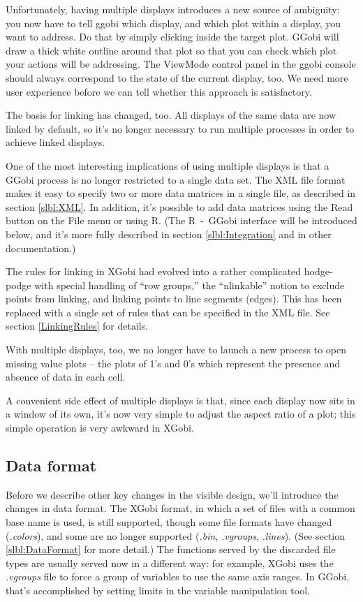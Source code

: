 \documentclass[11pt]{article}
\begin{document}
Unfortunately, having multiple displays introduces a new source of
ambiguity: you now have to tell ggobi which display, and which plot
within a display, you want to address.  Do that by simply clicking
inside the target plot.  GGobi will draw a thick white outline around
that plot so that you can check which plot your actions will be
addressing.  The ViewMode control panel in the ggobi console should
always correspond to the state of the current display, too.  We need
more user experience before we can tell whether this approach is
satisfactory.

The basis for linking has changed, too.  All displays of the same data
are now linked by default, so it's no longer necessary to run
multiple processes in order to achieve linked displays.

One of the most interesting implications of using multiple displays
is that a GGobi process is no longer restricted to a single data
set.  The XML file format makes it easy to specify two or more data
matrices in a single file, as described in section \ref{slbl:XML}.
In addition, it's possible to add data matrices using the Read button
on the File menu or using R.  (The R~-~GGobi interface will be
introduced below, and it's more fully described in section
\ref{slbl:Integration} and in other documentation.)

The rules for linking in XGobi had evolved into a rather complicated
hodge-podge with special handling of ``row groups,'' the
``nlinkable'' notion to exclude points from linking, and linking
points to line segments (edges).  This has been replaced with a single set
of rules that can be specified in the XML file.  See section 
\ref{LinkingRules} for details.

With multiple displays, too, we no longer have to launch a new
process to open missing value plots -- the plots of 1's and 0's
which represent the presence and absence of data in each cell.

A convenient side effect of multiple displays is that, since each
display now sits in a window of its own, it's now very simple to
adjust the aspect ratio of a plot; this simple operation is very
awkward in XGobi.

\subsection {Data format}

Before we describe other key changes in the visible design, we'll
introduce the changes in data format.  The XGobi format, in which a
set of files with a common base name is used, is still supported,
though some file formats have changed ({\em .colors}), and some are no
longer supported ({\em .bin}, {\em .vgroups}, {\em .lines}).  (See
section \ref{slbl:DataFormat} for more detail.) The functions served
by the discarded file types are usually served now in a different
way:  for example, XGobi uses the {\em .vgroups} file to force
a group of variables to use the same axis ranges.  In GGobi, that's
accomplished by setting limits in the variable manipulation tool.
\end{document}
